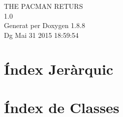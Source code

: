 \documentclass[twoside]{book}
\newcommand{\+}{\discretionary{\mbox{\scriptsize$\hookleftarrow$}}{}{}}
\newcommand{\clearemptydoublepage}{%
  \newpage{\pagestyle{empty}\cleardoublepage}%
}
\begin{document}
\hypersetup{pageanchor=false,
             bookmarks=true,
             bookmarksnumbered=true,
             pdfencoding=unicode
            }
\begin{titlepage}
\vspace*{7cm}
\begin{center}%
{\Large T\+H\+E P\+A\+C\+M\+A\+N R\+E\+T\+U\+R\+S \\[1ex]\large 1.\+0 }\\
\vspace*{1cm}
{\large Generat per Doxygen 1.8.8}\\
\vspace*{0.5cm}
{\small Dg Mai 31 2015 18:59:54}\\
\end{center}
\end{titlepage}
\clearemptydoublepage
\tableofcontents
\clearemptydoublepage
{}
\hypersetup{pageanchor=true}

\chapter{Índex Jeràrquic}

\chapter{Índex de Classes}

\end{document}
